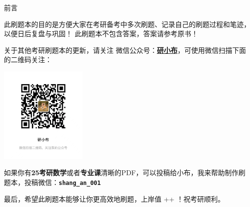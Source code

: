 \clearpage
\vspace*{0mm} %
\begin{center}
    \large \heiti 前言
\end{center}



\hspace*{2em}此刷题本的目的是方便大家在考研备考中多次刷题、记录自己的刷题过程和笔迹，以便日后复盘与巩固！
此刷题本不包含答案，答案请参考原书！

\hspace*{2em}关于其他考研刷题本的更新，请关注 \faWeixin 微信公众号：\underline{\textbf{研小布}}，可使用微信扫描下面的二维码关注：


\begin{minipage}[t]{1.0\textwidth}
    \centering
    \includegraphics[width=0.32\textwidth]{img/qr01.jpg} 
\end{minipage}

\hspace*{2em}如果你有\textbf{25考研数学}或者\textbf{专业课}清晰的PDF，可以投稿给小布，我来帮助制作刷题本，投稿微信：\textbf{\texttt{shang\_an\_001}}

\hspace*{2em}最后，希望此刷题本能够让你更高效地刷题，上岸值 ++ ！祝考研顺利。
\clearpage